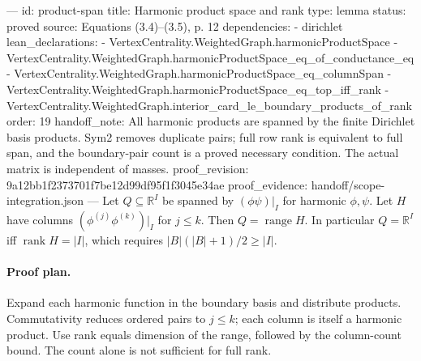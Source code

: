 ---
id: product-span
title: Harmonic product space and rank
type: lemma
status: proved
source: Equations (3.4)–(3.5), p. 12
dependencies:
- dirichlet
lean_declarations:
- VertexCentrality.WeightedGraph.harmonicProductSpace
- VertexCentrality.WeightedGraph.harmonicProductSpace_eq_of_conductance_eq
- VertexCentrality.WeightedGraph.harmonicProductSpace_eq_columnSpan
- VertexCentrality.WeightedGraph.harmonicProductSpace_eq_top_iff_rank
- VertexCentrality.WeightedGraph.interior_card_le_boundary_products_of_rank
order: 19
handoff_note: All harmonic products are spanned by the finite Dirichlet basis products. Sym2 removes duplicate pairs; full row rank is equivalent to full span, and the boundary-pair count is a proved necessary condition. The actual matrix is independent of masses.
proof_revision: 9a12bb1f2373701f7be12d99df95f1f3045e34ae
proof_evidence: handoff/scope-integration.json
---
Let $Q\subseteq\mathbb R^I$ be spanned by $(\phi\psi)|_I$ for harmonic $\phi,\psi$. Let $H$ have columns $(\phi^{(j)}\phi^{(k)})|_I$ for $j\leq k$. Then $Q=\operatorname{range}H$. In particular $Q=\mathbb R^I$ iff $\operatorname{rank}H=|I|$, which requires $|B|(|B|+1)/2\geq|I|$.

\paragraph{Proof plan.}
Expand each harmonic function in the boundary basis and distribute products. Commutativity reduces ordered pairs to $j\leq k$; each column is itself a harmonic product. Use rank equals dimension of the range, followed by the column-count bound. The count alone is not sufficient for full rank.
